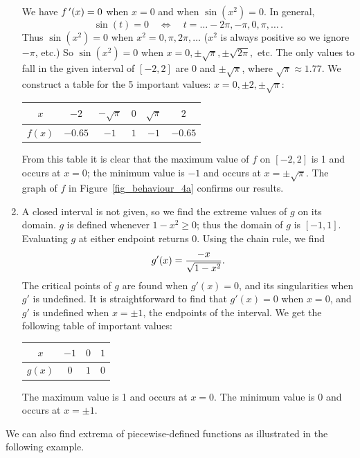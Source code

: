 \begin{example}
\begin{enumerate}
We have $f\,'(x) = 0$ when $x = 0$ and when $\sin (x^2) = 0$. In general, 
$$
\sin(t) = 0 \quad\Leftrightarrow\quad t = \ldots -2\pi, -\pi, 0, \pi, \ldots\,.
$$
Thus $\sin (x^2) = 0$ when $x^2 = 0, \pi, 2\pi, \ldots$ ($x^2$ is always positive so we ignore $-\pi$, etc.) So $\sin (x^2)=0$ when $x= 0, \pm \sqrt{\pi}, \pm\sqrt{2\pi},$ etc. The only values to fall in the given interval of $[-2,2]$ are $0$ and $\pm\sqrt{\pi}$, where $\sqrt{\pi} \approx 1.77$. We construct a table for the 5 important values: $x= 0, \pm 2, \pm\sqrt{\pi}$: 
\begin{center}
\begin{tabular}{c||ccccc} 
$x$ &$-2$&$-\sqrt{\pi}$&$0$&$\sqrt{\pi}$&$2$\\\hline
$f(x)$&$-0.65$ &$-1$&$1$&$-1$&$-0.65$
\end{tabular}
\end{center}


From this table it is clear that the maximum value of $f$ on $[-2,2]$ is 1 and occurs at $x=0$; the minimum value is $-1$ and occurs at $x=\pm\sqrt{\pi}$. The graph of $f$ in Figure~\ref{fig_behaviour_4a} confirms our results.

\item A closed interval is not given, so we find the extreme values of $g$ on its domain. $g$ is defined whenever $1-x^2\geq 0$; thus the domain of $g$ is $[-1,1]$. Evaluating $g$ at either endpoint returns 0. Using the chain rule, we find 
$$\displaystyle g'(x) = \frac{-x}{\sqrt{1-x^2}}.$$
The critical points of $g$ are found when $g'(x) = 0$, and its singularities when $g'$ is undefined. It is straightforward to find that $g'(x) = 0$ when $x=0$, and $g'$ is undefined when $x=\pm 1$, the endpoints of the interval. We get the following table of important values:
\begin{center}
\begin{tabular}{c||ccc} 
$x$ &$-1$&$0$&$1$\\\hline
$g(x)$&$0$ &$1$&$0$
\end{tabular}
\end{center}

The maximum value is 1 and occurs at $x=0$. The minimum value is 0 and occurs at $x=\pm1$. 
\end{enumerate}
\end{example}

We can also find extrema of piecewise-defined functions as illustrated in the following example. 


